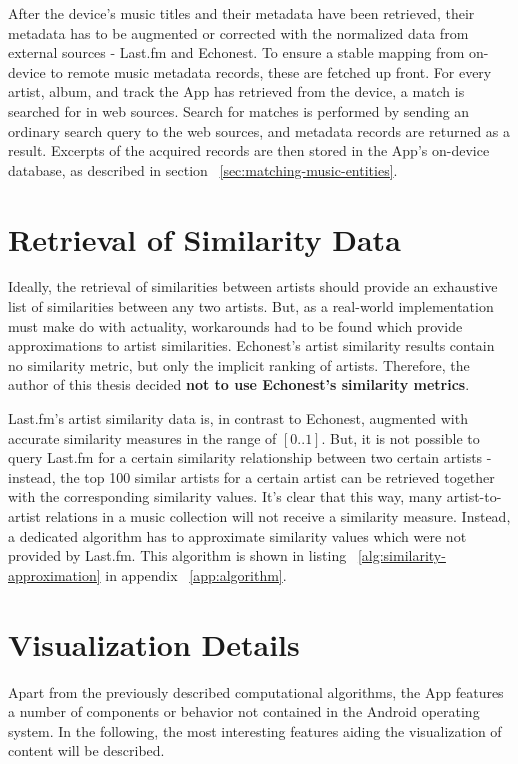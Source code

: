 After the device's music titles and their metadata have been retrieved, their metadata has to be augmented or corrected with the normalized data from external sources - Last.fm and Echonest. To ensure a stable mapping from on-device to remote music metadata records, these are fetched up front. For every artist, album, and track the App has retrieved from the device, a match is searched for in web sources. Search for matches is performed by sending an ordinary search query to the web sources, and metadata records are returned as a result. Excerpts of the acquired records are then stored in the App's on-device database, as described in section ~\ref{sec:matching-music-entities}.

\section{Retrieval of Similarity Data}

Ideally, the retrieval of similarities between artists should provide an exhaustive list of similarities between any two artists. But, as a real-world implementation must make do with actuality, workarounds had to be found which provide approximations to artist similarities.
Echonest's artist similarity results contain no similarity metric, but only the implicit ranking of artists. Therefore, the author of this thesis decided \textbf{not to use Echonest's similarity metrics}.

Last.fm's artist similarity data is, in contrast to Echonest, augmented with accurate similarity measures in the range of $[0 .. 1]$. But, it is not possible to query Last.fm for a certain similarity relationship between two certain artists - instead, the top 100 similar artists for a certain artist can be retrieved together with the corresponding similarity values. It's clear that this way, many artist-to-artist relations in a music collection will not receive a similarity measure. Instead, a dedicated algorithm has to approximate similarity values which were not provided by Last.fm. This algorithm is shown in listing ~\ref{alg:similarity-approximation} in  appendix ~\ref{app:algorithm}.


\section{Visualization Details}

Apart from the previously described computational algorithms, the App features a number of components or behavior not contained in the Android operating system. In the following, the most interesting features aiding the visualization of content will be described.

